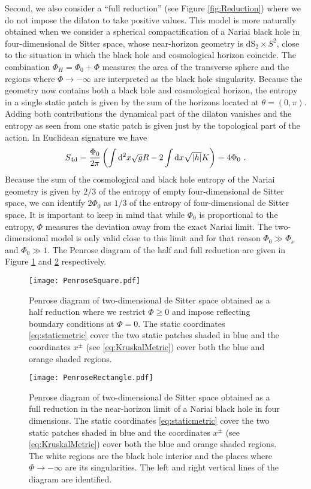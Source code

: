 \documentclass[a4paper,11pt]{article}
\newcommand{\beq}{\begin{equation}}
\newcommand{\eeq}{\end{equation}}
\newcommand{\rmd}{\mathrm{d}}
\numberwithin{equation}{section}
\begin{document}
Second, we also consider a ``full reduction'' (see Figure \ref{fig:Reduction}) where we do not impose the dilaton to take positive values. This model is more naturally obtained when we consider a spherical compactification of a Nariai black hole in four-dimensional de Sitter space, whose near-horizon geometry is dS$_2\times S^2$, close to the situation in which the black hole and cosmological horizon coincide. The combination $\Phi_H=\Phi_0+\Phi$ measures the area of the transverse sphere and the regions where $\Phi\to-\infty$ are interpreted as the black hole singularity. Because the geometry now contains both a black hole and cosmological horizon, the entropy in a single static patch is given by the sum of the horizons located at $\theta=(0,\pi)$. 
Adding both contributions the dynamical part of the dilaton vanishes and the entropy as seen from one static patch is given just by the topological part of the action. In Euclidean signature we have
\beq
S_{\rm 4d} =\frac{\Phi_0}{2\pi}\left(\int \rmd^2x\sqrt{g}R - 2\int\rmd x\sqrt{|h|} K\right) = 4\Phi_0 ~.
\eeq
Because the sum of the cosmological and black hole entropy of the Nariai geometry is given by $2/3$ of the entropy of empty four-dimensional de Sitter space, we can identify $2\Phi_0$ as $1/3$ of the entropy of four-dimensional de Sitter space. It is important to keep in mind that while $\Phi_0$ is proportional to the entropy, $\Phi$ measures the deviation away from the exact Nariai limit. The two-dimensional model is only valid close to this limit and for that reason $\Phi_{0}\gg \Phi_{s}$ and $\Phi_{0}\gg1$. The Penrose diagram of the half and full reduction are given in Figure \ref{fig:PenroseSquare} and \ref{fig:PenroseRectangle} respectively.
%
\begin{figure}[ht!]
\centering
\texttt{[image: PenroseSquare.pdf]}
\caption{Penrose diagram of two-dimensional de Sitter space obtained as a half reduction where we restrict $\Phi\geq0$ and impose reflecting boundary conditions at $\Phi=0$. The static coordinates \eqref{eq:staticmetric} cover the two static patches shaded in blue and the coordinates $x^\pm$ (see \eqref{eq:KruskalMetric}) cover both the blue and orange shaded regions.}
\label{fig:PenroseSquare}
\end{figure}
%
\begin{figure}[ht!]
\centering
\texttt{[image: PenroseRectangle.pdf]}
\caption{Penrose diagram of two-dimensional de Sitter space obtained as a full reduction in the near-horizon limit of a Nariai black hole in four dimensions. The static coordinates \eqref{eq:staticmetric} cover the two static patches shaded in blue and the coordinates $x^\pm$ (see \eqref{eq:KruskalMetric}) cover both the blue and orange shaded regions. The white regions are the black hole interior and the places where $\Phi\to-\infty$ are its singularities. The left and right vertical lines of the diagram are identified.}
\label{fig:PenroseRectangle}
\end{figure}
%
\end{document}
